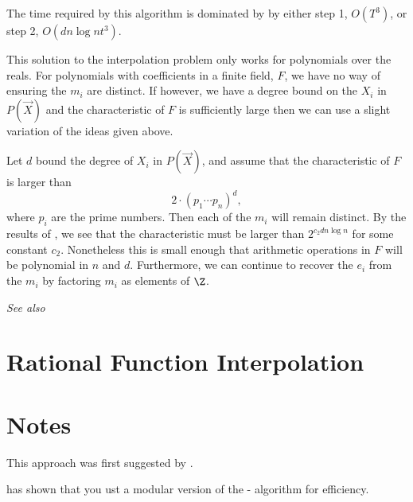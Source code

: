 The time required by this algorithm is dominated by by either step 1,
$O(T^3)$, or step 2, $O(dn \log n t^3)$.

\medskip
This solution to the interpolation problem only works for polynomials over
the reals.  For polynomials with coefficients in a finite field, $F$, we
have no way of ensuring the $m_i$ are distinct.  If however, we have a
degree bound on the $X_i$ in $P(\vec X)$ and the characteristic of $F$ is
sufficiently large then we can use a slight variation of the ideas given
above.

Let $d$ bound the degree of $X_i$ in $P(\vec X)$, and assume that the
characteristic of $F$ is larger than 
\[
2 \cdot (p_1 \cdots p_n)^d,
\]
where $p_i$ are the prime numbers.  Then each of the $m_i$ will remain
distinct.  By the results of , we see that
the characteristic must be larger than $2^{c_2 d n \log n}$ for some
constant $c_2$.  Nonetheless this is small enough that arithmetic
operations in $F$ will be polynomial in $n$ and $d$.  Furthermore, we
can continue to recover the $e_i$ from the $m_i$ by factoring $m_i$ as
elements of $\Z$.

{\em See also \cite{Roth91}}

\section{Rational Function Interpolation}
\label{Sparse:Ratfun:Sec}

\section*{Notes}

\footnotesize

 This approach was first suggested by
{\Brown} \cite{Brown:Euclid}.

  {\Kaltofen} \cite{Kaltofen90c} has shown
that you ust a modular version of the {\BenOr}-{\Tiwari} algorithm for
efficiency. 

\normalsize
